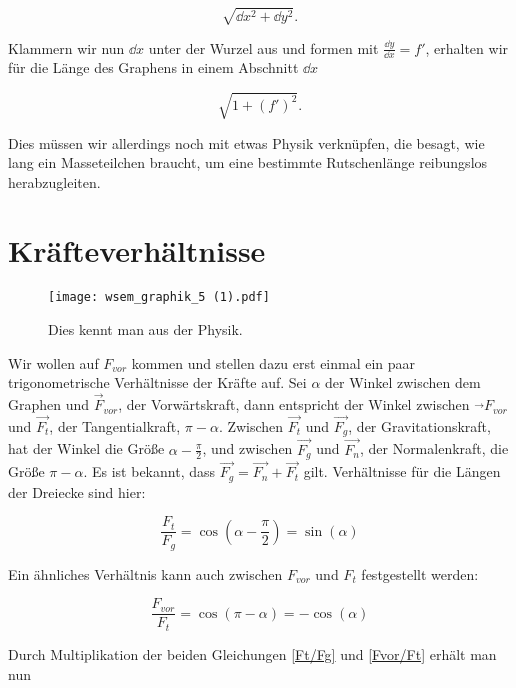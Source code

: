\begin{equation}
 \sqrt{\dd x^2+\dd y^2}.
\end{equation}

Klammern wir nun $\dd x$ unter der Wurzel aus und formen mit $\frac{\dd y}{\dd x}=f'$, erhalten wir für die Länge des Graphens in einem Abschnitt $\dd x$

\begin{equation}
\sqrt{1+(f')^2}.
\end{equation}


Dies müssen wir allerdings noch mit etwas Physik verknüpfen, die besagt, wie lang ein Masseteilchen braucht, um eine bestimmte Rutschenlänge reibungslos herabzugleiten.

\section{Kräfteverhältnisse}
\begin{figure}[h]
 \centering
 \texttt{[image: wsem\_graphik\_5 (1).pdf]} 
 \caption[Kräfteverhältnisse. TikZ - eigene Arbeit.]{Dies kennt man aus der Physik.}
 \label{fig:kräfteverhältnisse} 
\end{figure}

Wir wollen auf $F_{vor}$ kommen und stellen dazu erst einmal ein paar trigonometrische Verhältnisse der Kräfte auf. 
Sei $\alpha$ der Winkel zwischen dem Graphen und $\Vec{F}_{vor}$, der Vorwärtskraft, dann entspricht der Winkel zwischen $\Vec{}F_{vor}$ und $\Vec{F_t}$, der Tangentialkraft, $\pi - \alpha$. 
Zwischen $\Vec{F_t}$ und $\Vec{F_g}$, der Gravitationskraft, hat der Winkel die Größe $\alpha - \frac{\pi}{2}$, und zwischen $\Vec{F_g}$ und $\vec{F_n}$, der Normalenkraft, die Größe $\pi - \alpha$.
Es ist bekannt, dass $\Vec{F_g}=\Vec{F_n}+ \Vec{F_t}$ gilt. Verhältnisse für die Längen der Dreiecke sind hier:

\begin{equation}\label{Ft/Fg}
 \frac{F_t}{F_g}
 = \cos \left(\alpha - \frac{\pi}{2}\right)= \sin(\alpha)
\end{equation}

Ein ähnliches Verhältnis kann auch zwischen $F_{vor}$ und $F_t$ festgestellt werden:

\begin{equation}\label{Fvor/Ft}
 \frac{F_{vor}}{F_t}
 = \cos(\pi - \alpha)= -\cos(\alpha)
\end{equation}


Durch Multiplikation der beiden Gleichungen \ref{Ft/Fg} und \ref{Fvor/Ft} erhält man nun

